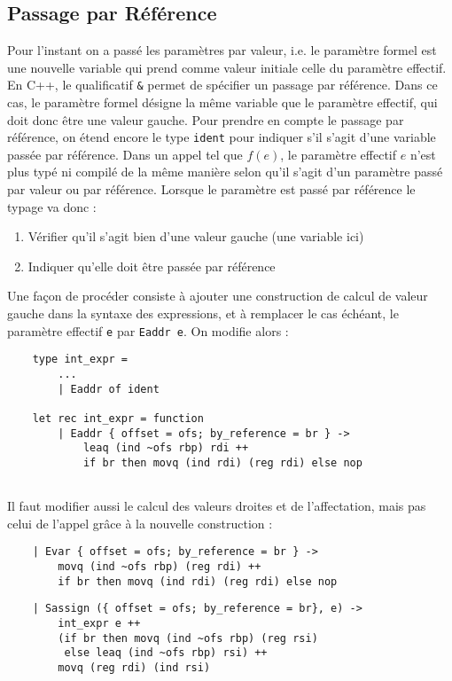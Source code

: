 \documentclass{cours}
\begin{document}
\subsection{Passage par Référence}
Pour l'instant on a passé les paramètres par valeur, i.e. le paramètre formel est une nouvelle variable qui prend comme valeur initiale celle du paramètre effectif. En C++, le qualificatif \texttt{\&} permet de spécifier un passage par référence. Dans ce cas, le paramètre formel désigne la même variable que le paramètre effectif, qui doit donc être une valeur gauche.
Pour prendre en compte le passage par référence, on étend encore le type \texttt{ident} pour indiquer s'il s'agit d'une variable passée par référence. Dans un appel tel que $f(e)$, le paramètre effectif $e$ n'est plus typé ni compilé de la même manière selon qu'il s'agit d'un paramètre passé par valeur ou par référence. Lorsque le paramètre est passé par référence le typage va donc :
\begin{enumerate}
    \item Vérifier qu'il s'agit bien d'une valeur gauche (une variable ici)
    \item Indiquer qu'elle doit être passée par référence
\end{enumerate}

Une façon de procéder consiste à ajouter une construction de calcul de valeur gauche dans la syntaxe des expressions, et à remplacer le cas échéant, le paramètre effectif \texttt{e} par \texttt{Eaddr e}.
On modifie alors :
\begin{verbatim}
    type int_expr =
        ...
        | Eaddr of ident

    let rec int_expr = function
        | Eaddr { offset = ofs; by_reference = br } ->
            leaq (ind ~ofs rbp) rdi ++
            if br then movq (ind rdi) (reg rdi) else nop
    
\end{verbatim}

Il faut modifier aussi le calcul des valeurs droites et de l'affectation, mais pas celui de l'appel grâce à la nouvelle construction :
\begin{verbatim}
    | Evar { offset = ofs; by_reference = br } ->
        movq (ind ~ofs rbp) (reg rdi) ++
        if br then movq (ind rdi) (reg rdi) else nop
\end{verbatim}

\begin{verbatim}
    | Sassign ({ offset = ofs; by_reference = br}, e) ->
        int_expr e ++
        (if br then movq (ind ~ofs rbp) (reg rsi)
         else leaq (ind ~ofs rbp) rsi) ++
        movq (reg rdi) (ind rsi)
\end{verbatim}
\end{document}
